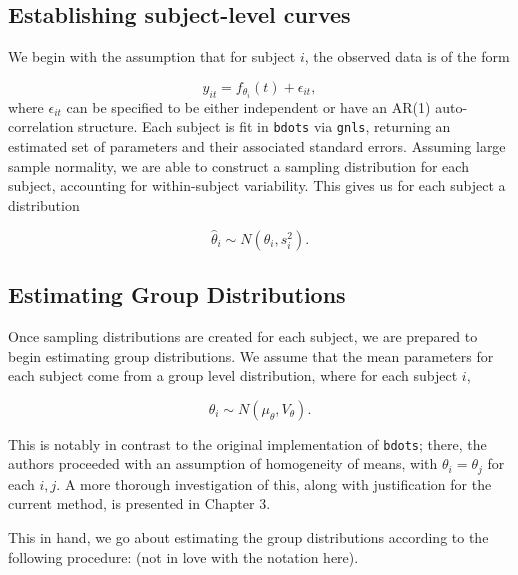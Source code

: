 \documentclass{article}
\newcommand{\xt}{\texttt}%
\begin{document}
\subsection{Establishing subject-level curves}

We begin with the assumption that for subject $i$, the observed data is of the form

\begin{equation}\label{eq:mean_structure}
y_{it} = f_{\theta_i}(t) + \epsilon_{it},
\end{equation}
where $\epsilon_{it}$ can be specified to be either independent or have an AR(1) auto-correlation structure. Each subject is fit in \xt{bdots} via \xt{gnls}, returning an estimated set of parameters and their associated standard errors. Assuming large sample normality, we are able to construct a sampling distribution for each subject, accounting for within-subject variability. This gives us for each subject a distribution

\begin{equation}
\hat{\theta}_i \sim N(\theta_i, s_i^2).
\end{equation}

\subsection{Estimating Group Distributions}\label{sec:group_dist}

Once sampling distributions are created for each subject, we are prepared to begin estimating group distributions. We assume that the mean parameters for each subject come from a group level distribution, where for each subject $i$,

\begin{equation}
\theta_i \sim N(\mu_{\theta}, V_{\theta}).
\end{equation}

This is notably in contrast to the original implementation of \xt{bdots}; there, the authors proceeded with an assumption of homogeneity of means, with $\theta_i = \theta_j$ for each $i, j$. A more thorough investigation of this, along with justification for the current method, is presented in Chapter 3.

This in hand, we go about estimating the group distributions according to the following procedure: (not in love with the notation here).
\end{document}
